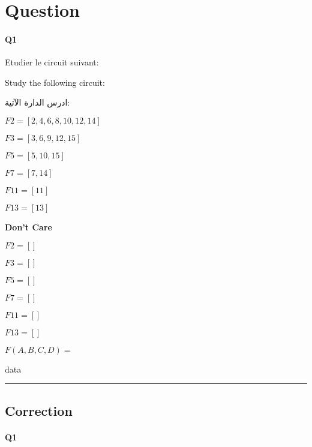 
\section{Question}


\paragraph{Q1}



Etudier le circuit suivant:



Study the following circuit:

\begin{arab}[utf]
ادرس الدارة الآتية:
\end{arab}

 

$F2 = [2, 4, 6, 8, 10, 12, 14]$



$F3 = [3, 6, 9, 12, 15]$



$F5 = [5, 10, 15]$



$F7 = [7, 14]$



$F11 = [11]$



$F13 = [13]$



\textbf{Don't Care }
 
$F2 = []$

$F3 = []$

$F5 = []$

$F7 = []$

$F11 = []$

$F13 = []$



$F(A,B,C,D) =$



 


data


\hrule width 1\linewidth
\pagebreak

\subsection{Correction}


\paragraph{Q1}




